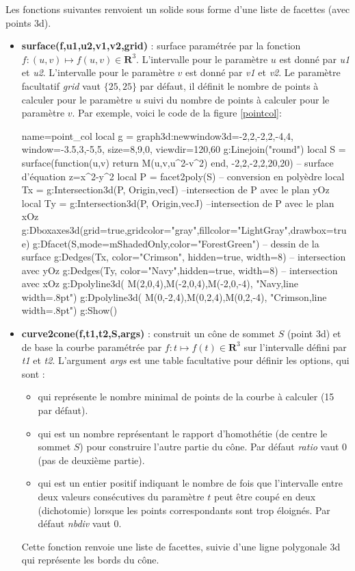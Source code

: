 Les fonctions suivantes renvoient un solide sous forme d'une liste de facettes (avec points 3d).
\begin{itemize}
    \item \textbf{surface(f,u1,u2,v1,v2,grid)} : surface paramétrée par la fonction $f\colon(u,v) \mapsto f(u,v)\in \mathbf R^3$. L'intervalle pour le paramètre $u$ est donné par \emph{u1} et \emph{u2}. L'intervalle pour le paramètre $v$ est donné par \emph{v1} et \emph{v2}. Le paramètre facultatif \emph{grid} vaut $\{25,25\}$ par défaut, il définit le nombre de points à calculer pour le paramètre $u$ suivi du nombre de points à calculer pour le paramètre $v$. Par exemple, voici le code de la figure \ref{pointcol}:
\begin{Luacode}
\begin{luadraw}{name=point_col}
local g = graph3d:new{window3d={-2,2,-2,2,-4,4}, window={-3.5,3,-5,5}, size={8,9,0}, viewdir={120,60}}
g:Linejoin("round")
local S = surface(function(u,v) return M(u,v,u^2-v^2) end, -2,2,-2,2,{20,20}) -- surface d'équation z=x^2-y^2
local P = facet2poly(S) -- conversion en polyèdre
local Tx = g:Intersection3d(P, {Origin,vecI}) --intersection de P avec le plan yOz
local Ty = g:Intersection3d(P, {Origin,vecJ}) --intersection de P avec le plan xOz
g:Dboxaxes3d({grid=true,gridcolor="gray",fillcolor="LightGray",drawbox=true})
g:Dfacet(S,{mode=mShadedOnly,color="ForestGreen"}) -- dessin de la surface
g:Dedges(Tx, {color="Crimson", hidden=true, width=8}) -- intersection avec yOz
g:Dedges(Ty, {color="Navy",hidden=true, width=8}) -- intersection avec xOz
g:Dpolyline3d( {M(2,0,4),M(-2,0,4),M(-2,0,-4)}, "Navy,line width=.8pt")
g:Dpolyline3d( {M(0,-2,4),M(0,2,4),M(0,2,-4)}, "Crimson,line width=.8pt")
g:Show()
\end{luadraw}
\end{Luacode}

    \item \textbf{curve2cone(f,t1,t2,S,args)} : construit un cône de sommet $S$ (point 3d) et de base la courbe paramétrée par $f\colon t\mapsto f(t)\in\mathbf R^3$ sur l'intervalle défini par \emph{t1} et \emph{t2}. L'argument \emph{args} est une table facultative pour définir les options, qui sont :
    \begin{itemize}
        \item {} qui représente le nombre minimal de points de la courbe à calculer (15 par défaut).
        \item {} qui est un nombre représentant le rapport d'homothétie (de centre le sommet $S$) pour construire l'autre partie du cône. Par défaut \emph{ratio} vaut 0 (pas de deuxième partie).
        \item {} qui est un entier positif indiquant le nombre de fois que l'intervalle entre deux valeurs consécutives du paramètre $t$ peut être coupé en deux (dichotomie) lorsque les points correspondants sont trop éloignés. Par défaut \emph{nbdiv} vaut 0.
    \end{itemize}
 Cette fonction renvoie une liste de facettes, suivie d'une ligne polygonale 3d qui représente les bords du cône.
 

\end{itemize}
